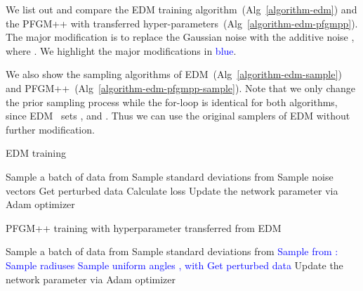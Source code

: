 We list out and compare the EDM training algorithm~(Alg~\ref{algorithm-edm}) and the PFGM++ with transferred hyper-parameters~(Alg~\ref{algorithm-edm-pfgmpp}). The major modification is to replace the Gaussian noise  with the additive noise , where . We highlight the major modifications in \textcolor{blue}{blue}.

We also show the sampling algorithms of EDM~(Alg~\ref{algorithm-edm-sample}) and PFGM++~(Alg~\ref{algorithm-edm-pfgmpp-sample}). Note that we only change the prior sampling process while the for-loop is identical for both algorithms, since EDM~\citep{Karras2022ElucidatingTD} sets , and . Thus we can use the original samplers of EDM without further modification.

\begin{minipage}{0.46\textwidth}
\vspace{-46pt}
\begin{algorithm}[H]
    \centering
    \caption{EDM training}\label{algorithm-edm}
    \begin{algorithmic}[1]
        \STATE Sample a batch of data  from 
        \STATE Sample standard deviations  from  
        \STATE Sample noise vectors 
        \STATE Get perturbed data 
        \STATE Calculate loss 
        \STATE Update the network parameter  via Adam optimizer
    \end{algorithmic}
\end{algorithm}
\end{minipage}
\hfill
\begin{minipage}{0.50\textwidth}
\begin{algorithm}[H]
    \centering
    \caption{PFGM++ training with hyperparameter transferred from EDM}\label{algorithm-edm-pfgmpp}
    \begin{algorithmic}[1]
        \STATE Sample a batch of data  from 
        \STATE Sample standard deviations  from  
        \STATE \textcolor{blue}{Sample  from : }
        \STATE  \textcolor{blue}{Sample radiuses }
        \STATE  \textcolor{blue}{Sample uniform angles , with }
        \STATE \textcolor{blue}{Get perturbed data }
        \STATE Update the network parameter  via Adam optimizer
    \end{algorithmic}
\end{algorithm}
\end{minipage}

